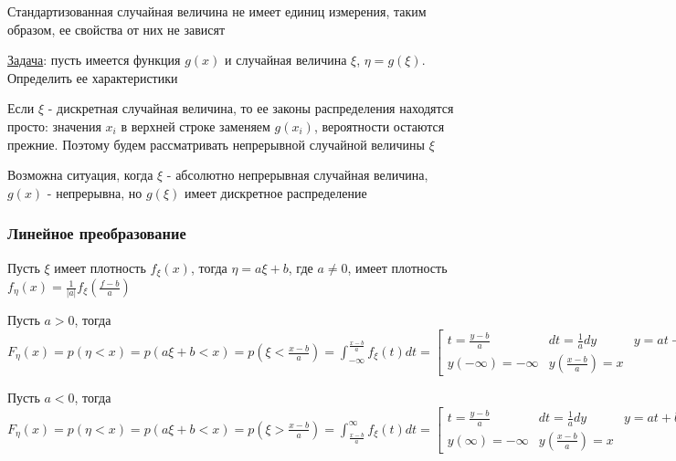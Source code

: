 \documentclass[12pt]{article}
\begin{document}
    Стандартизованная случайная величина не имеет единиц измерения, таким образом, ее свойства от них не зависят

    \mediumvspace

    \underline{Задача}: пусть имеется функция $g(x)$ и случайная величина $\xi$, $\eta = g(\xi)$. Определить ее характеристики

    \Nota Если $\xi$ - дискретная случайная величина, то ее законы распределения находятся просто: значения $x_i$ в верхней строке заменяем $g(x_i)$, вероятности остаются прежние.
    Поэтому будем рассматривать непрерывной случайной величины $\xi$

    \Notas Возможна ситуация, когда $\xi$ - абсолютно непрерывная случайная величина, $g(x)$ - непрерывна, но $g(\xi)$ имеет дискретное распределение

    \subsubsection{Линейное преобразование}

    \begin{MyTheorem}
        \Ths Пусть $\xi$ имеет плотность $f_\xi(x)$, тогда $\eta = a\xi + b$, где $a \neq 0$, имеет плотность $f_\eta(x) = \frac{1}{|a|}f_\xi(\frac{f - b}{a})$
    \end{MyTheorem}

    \begin{MyProof}
        Пусть $a > 0$, тогда $F_\eta(x) = p(\eta < x) = p(a\xi + b < x) = p(\xi < \frac{x - b}{a}) = \int_{-\infty}^{\frac{x - b}{a}} f_\xi(t) dt = 
        \left[\begin{matrix}t = \frac{y - b}{a} & dt = \frac{1}{a} dy & y = at + b \\ y(-\infty) = -\infty & y(\frac{x - b}{a}) = x\end{matrix}\right] = 
        \int_{-\infty}^x \frac{1}{a} f_\xi(\frac{y - b}{a}) dy \Longrightarrow \eta = \frac{1}{|a|} f_\xi (\frac{x - b}{a})$

        Пусть $a < 0$, тогда $F_\eta(x) = p(\eta < x) = p(a\xi + b < x) = p(\xi > \frac{x - b}{a}) = \int_{\frac{x - b}{a}}^{\infty} f_\xi(t) dt = 
        \left[\begin{matrix}t = \frac{y - b}{a} & dt = \frac{1}{a} dy & y = at + b \\ y(\infty) = -\infty & y(\frac{x - b}{a}) = x\end{matrix}\right] = 
        -\int_{-\infty}^x \frac{1}{a} f_\xi(\frac{y - b}{a}) dy \Longrightarrow \eta = \frac{1}{|a|} f_\xi (\frac{x - b}{a})$
    \end{MyProof}
\end{document}
